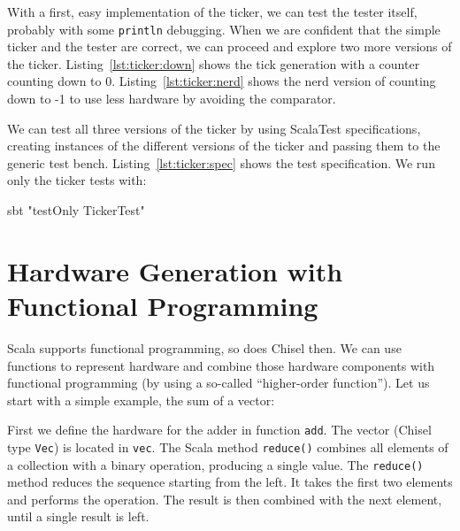 \documentclass[%
    10pt,
    headinclude, footexclude,
    openright, %
    notitlepage,
    cleardoubleempty,
    headsepline,
    pointlessnumbers,
    bibtotoc, idxtotoc,
    ]{scrbook}
\newcommand{\code}[1]{{\small{\texttt{#1}}}}
\begin{document}

With a first, easy implementation of the ticker, we can test the tester
itself, probably with some \code{println} debugging. When we are confident that
the simple ticker and the tester are correct, we can proceed and explore
two more versions of the ticker. Listing~\ref{lst:ticker:down} shows the tick
generation with a counter counting down to 0.
Listing~\ref{lst:ticker:nerd} shows the nerd version of counting down to -1 to use
less hardware by avoiding the comparator.



We can test all three versions of the ticker by using ScalaTest specifications,
creating instances of the different versions of the ticker and passing them
to the generic test bench. Listing~\ref{lst:ticker:spec} shows the test specification.
We run only the ticker tests with:
\begin{chisel}
sbt "testOnly TickerTest"
\end{chisel}


\section{Hardware Generation with Functional Programming}
\label{sec:functional}


Scala supports functional programming, so does Chisel then.
We can use functions to represent hardware and combine those hardware components
with functional programming (by using a so-called ``higher-order function'').
Let us start with a simple example, the sum of a vector:


\noindent First we define the hardware for the adder in function \code{add}.
The vector (Chisel type \code{Vec}) is located in \code{vec}. The Scala method \code{reduce()} combines
all elements of a collection with a binary operation, producing a single value.
The \code{reduce()} method reduces the sequence starting from the left.
It takes the first two elements and performs the operation. The result is then combined
with the next element, until a single result is left.
\end{document}

